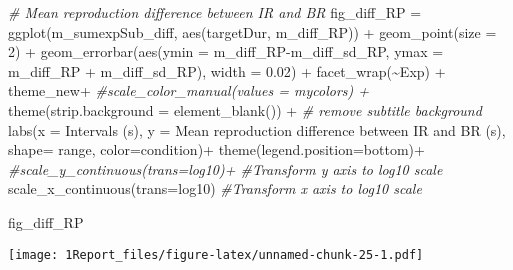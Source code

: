 \documentclass[
]{article}
\newenvironment{Shaded}{\begin{snugshade}}{\end{snugshade}}
\newcommand{\AttributeTok}[1]{\textcolor[rgb]{0.77,0.63,0.00}{#1}}
\newcommand{\CommentTok}[1]{\textcolor[rgb]{0.56,0.35,0.01}{\textit{#1}}}
\newcommand{\DecValTok}[1]{\textcolor[rgb]{0.00,0.00,0.81}{#1}}
\newcommand{\FloatTok}[1]{\textcolor[rgb]{0.00,0.00,0.81}{#1}}
\newcommand{\FunctionTok}[1]{\textcolor[rgb]{0.00,0.00,0.00}{#1}}
\newcommand{\NormalTok}[1]{#1}
\newcommand{\OtherTok}[1]{\textcolor[rgb]{0.56,0.35,0.01}{#1}}
\newcommand{\SpecialCharTok}[1]{\textcolor[rgb]{0.00,0.00,0.00}{#1}}
\newcommand{\StringTok}[1]{\textcolor[rgb]{0.31,0.60,0.02}{#1}}
\begin{document}
\begin{Shaded}
\begin{Highlighting}[]
\CommentTok{\# Mean reproduction difference between IR and BR}
\NormalTok{fig\_diff\_RP }\OtherTok{=} \FunctionTok{ggplot}\NormalTok{(m\_sumexpSub\_diff, }\FunctionTok{aes}\NormalTok{(targetDur, m\_diff\_RP)) }\SpecialCharTok{+} 
  \FunctionTok{geom\_point}\NormalTok{(}\AttributeTok{size =} \DecValTok{2}\NormalTok{) }\SpecialCharTok{+}
  \FunctionTok{geom\_errorbar}\NormalTok{(}\FunctionTok{aes}\NormalTok{(}\AttributeTok{ymin =}\NormalTok{ m\_diff\_RP}\SpecialCharTok{{-}}\NormalTok{m\_diff\_sd\_RP, }\AttributeTok{ymax =}\NormalTok{ m\_diff\_RP }\SpecialCharTok{+}\NormalTok{ m\_diff\_sd\_RP), }\AttributeTok{width =} \FloatTok{0.02}\NormalTok{) }\SpecialCharTok{+} 
  \FunctionTok{facet\_wrap}\NormalTok{(}\SpecialCharTok{\textasciitilde{}}\NormalTok{Exp) }\SpecialCharTok{+}
\NormalTok{  theme\_new}\SpecialCharTok{+} \CommentTok{\#scale\_color\_manual(values = mycolors) +}
  \FunctionTok{theme}\NormalTok{(}\AttributeTok{strip.background =} \FunctionTok{element\_blank}\NormalTok{()) }\SpecialCharTok{+} \CommentTok{\# remove subtitle background}
  \FunctionTok{labs}\NormalTok{(}\AttributeTok{x =} \StringTok{\textquotesingle{}Intervals (s)\textquotesingle{}}\NormalTok{, }\AttributeTok{y =} \StringTok{\textquotesingle{}Mean reproduction difference between IR and BR (s)\textquotesingle{}}\NormalTok{, }\AttributeTok{shape=} \StringTok{\textquotesingle{}range\textquotesingle{}}\NormalTok{, }\AttributeTok{color=}\StringTok{\textquotesingle{}condition\textquotesingle{}}\NormalTok{)}\SpecialCharTok{+} 
  \FunctionTok{theme}\NormalTok{(}\AttributeTok{legend.position=}\StringTok{\textquotesingle{}bottom\textquotesingle{}}\NormalTok{)}\SpecialCharTok{+}
  \CommentTok{\#scale\_y\_continuous(trans=\textquotesingle{}log10\textquotesingle{})+ \#Transform y axis to log10 scale}
  \FunctionTok{scale\_x\_continuous}\NormalTok{(}\AttributeTok{trans=}\StringTok{\textquotesingle{}log10\textquotesingle{}}\NormalTok{) }\CommentTok{\#Transform x axis to log10 scale}

\NormalTok{fig\_diff\_RP}
\end{Highlighting}
\end{Shaded}

\texttt{[image: 1Report\_files/figure-latex/unnamed-chunk-25-1.pdf]}
\end{document}
